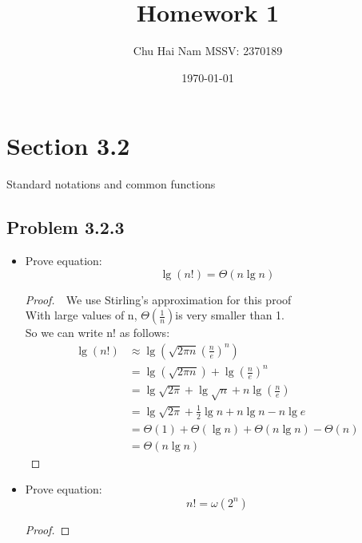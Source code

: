 \documentclass{article}
\title{Homework 1}
\author{Chu Hai Nam MSSV: 2370189}
\date\today
\begin{document}
\maketitle %

\section*{Section 3.2}
Standard notations and common functions

\subsection*{Problem 3.2.3}
\begin{itemize}
    \item Prove equation: \begin{equation} \lg(n!) = \Theta(n \lg n)\end{equation}
    \begin{proof}
        $ $\newline
        $ $\newline
        We use Stirling's approximation for this proof \\
        With large values of n, $\Theta (\frac{1}{n}) $is very smaller than 1. \\
        So we can write n! as follows: \\
        \begin{equation}
            \begin{aligned}
            \lg (n !) & \approx \lg \left(\sqrt{2 \pi n}\left(\frac{n}{e}\right)^n\right) \\
            & =\lg (\sqrt{2 \pi n})+\lg \left(\frac{n}{e}\right)^n \\
            & =\lg \sqrt{2 \pi}+\lg \sqrt{n}+n \lg \left(\frac{n}{e}\right) \\
            & =\lg \sqrt{2 \pi}+\frac{1}{2} \lg n+n \lg n-n \lg e \\
            & =\Theta(1)+\Theta(\lg n)+\Theta(n \lg n)-\Theta(n) \\
            & =\Theta(n \lg n)
            \end{aligned}
        \end{equation}
    \end{proof}
    \item Prove equation: \begin{equation} n! = \omega(2^n) \end{equation}
    \begin{proof}

\end{proof}
\end{itemize}
\end{document}
